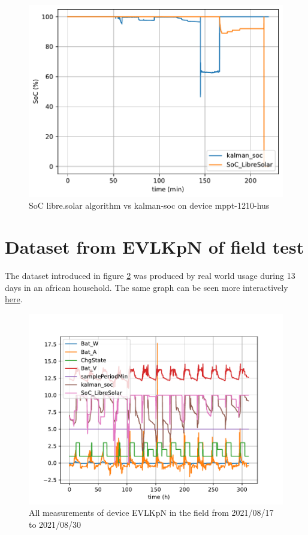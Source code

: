 \begin{figure}[h!]
\centering	
\includegraphics{mppt-1210-hus-2021-05-28T20:10:00.000Z-2021-05-29T02:19:00.000Z-librevskalman.pdf}
\caption{\label{fig:librevskalman-mppt-hus} SoC libre.solar algorithm vs kalman-soc on device mppt-1210-hus}
\end{figure}

\pagebreak 

\section{Dataset from EVLKpN of field test} 

The dataset introduced in figure \ref{fig:librevskalman-EVLKpN-all} was produced by real world usage during 13 days in an african household. The same graph can be seen more interactively \href{https://raw.githack.com/mulles/kalman-soc/main/data/EVLKpN_20210817-20210830_SOC_Graph.html}
{here}.  

\begin{figure}[h!]
\centering	
\includegraphics[width=16cm]{EVLKpN_20210817-20210830-librevskalman-all.pdf}
\caption{\label{fig:librevskalman-EVLKpN-all}  All measurements of device EVLKpN in the field from 2021/08/17 to 2021/08/30 }
\end{figure}

